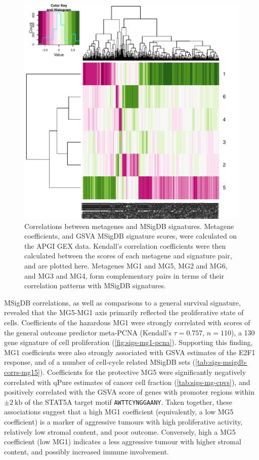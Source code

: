 \documentclass[dissertation.tex]{subfiles}
\begin{document}
\begin{figure}
\centering
\includegraphics[width=.7\linewidth]{analysis/biosurv/reports/18_SIS_diag_dsd_final/figure/nmf-msigdb-cor-plots-1}
\caption{Correlations between metagenes and \acrshort{MSigDB} signatures.  Metagene coefficients, and \acrshort{GSVA} \acrshort{MSigDB} signature scores, were calculated on the \acrshort{APGI} \acrshort{GEX} data.  Kendall's correlation coefficients were then calculated between the scores of each metagene and signature pair, and are plotted here.  Metagenes MG1 and MG5, MG2 and MG6, and MG3 and MG4, form complementary pairs in terms of their correlation patterns with \acrshort{MSigDB} signatures.\label{fig:sigs-nmf-corplots}}
\end{figure}

\gls{MSigDB} correlations, as well as comparisons to a general survival signature, revealed that the MG5-MG1 axis primarily reflected the proliferative state of cells.  Coefficients of the hazardous MG1 were strongly correlated with scores of the general outcome predictor meta-PCNA (Kendall's $\tau = 0.757$, $n = 110$), a 130 gene signature of cell proliferation \cite{Venet2011} (\cref{fig:sigs-mg1-pcna}).  Supporting this finding, MG1 coefficients were also strongly associated with \gls{GSVA} estimates of the E2F1 response, and of a number of cell-cycle related \gls{MSigDB} sets (\cref{tab:sigs-msigdb-corrs-mg15}).  Coefficients for the protective MG5 were significantly negatively correlated with qPure estimates of cancer cell fraction \cite{Song2012} (\cref{tab:sigs-mg-cpvs}), and positively correlated with the \gls{GSVA} score of genes with promoter regions within $\pm 2\ \text{kb}$ of the STAT5A target motif \texttt{AWTTCYNGGAANY}.  Taken together, these associations suggest that a high MG1 coefficient (equivalently, a low MG5 coefficient) is a marker of aggressive tumours with high proliferative activity, relatively low stromal content, and poor outcome.  Conversely, high a MG5 coefficient (low MG1) indicates a less aggressive tumour with higher stromal content, and possibly increased immune involvement.
\end{document}
